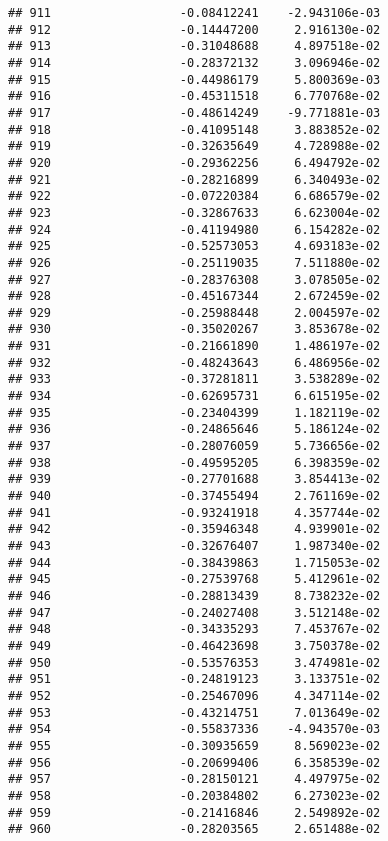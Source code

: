 \documentclass[
]{article}
\begin{document}
\begin{verbatim}
## 911                  -0.08412241    -2.943106e-03
## 912                  -0.14447200     2.916130e-02
## 913                  -0.31048688     4.897518e-02
## 914                  -0.28372132     3.096946e-02
## 915                  -0.44986179     5.800369e-03
## 916                  -0.45311518     6.770768e-02
## 917                  -0.48614249    -9.771881e-03
## 918                  -0.41095148     3.883852e-02
## 919                  -0.32635649     4.728988e-02
## 920                  -0.29362256     6.494792e-02
## 921                  -0.28216899     6.340493e-02
## 922                  -0.07220384     6.686579e-02
## 923                  -0.32867633     6.623004e-02
## 924                  -0.41194980     6.154282e-02
## 925                  -0.52573053     4.693183e-02
## 926                  -0.25119035     7.511880e-02
## 927                  -0.28376308     3.078505e-02
## 928                  -0.45167344     2.672459e-02
## 929                  -0.25988448     2.004597e-02
## 930                  -0.35020267     3.853678e-02
## 931                  -0.21661890     1.486197e-02
## 932                  -0.48243643     6.486956e-02
## 933                  -0.37281811     3.538289e-02
## 934                  -0.62695731     6.615195e-02
## 935                  -0.23404399     1.182119e-02
## 936                  -0.24865646     5.186124e-02
## 937                  -0.28076059     5.736656e-02
## 938                  -0.49595205     6.398359e-02
## 939                  -0.27701688     3.854413e-02
## 940                  -0.37455494     2.761169e-02
## 941                  -0.93241918     4.357744e-02
## 942                  -0.35946348     4.939901e-02
## 943                  -0.32676407     1.987340e-02
## 944                  -0.38439863     1.715053e-02
## 945                  -0.27539768     5.412961e-02
## 946                  -0.28813439     8.738232e-02
## 947                  -0.24027408     3.512148e-02
## 948                  -0.34335293     7.453767e-02
## 949                  -0.46423698     3.750378e-02
## 950                  -0.53576353     3.474981e-02
## 951                  -0.24819123     3.133751e-02
## 952                  -0.25467096     4.347114e-02
## 953                  -0.43214751     7.013649e-02
## 954                  -0.55837336    -4.943570e-03
## 955                  -0.30935659     8.569023e-02
## 956                  -0.20699406     6.358539e-02
## 957                  -0.28150121     4.497975e-02
## 958                  -0.20384802     6.273023e-02
## 959                  -0.21416846     2.549892e-02
## 960                  -0.28203565     2.651488e-02

\end{verbatim}
\end{document}
